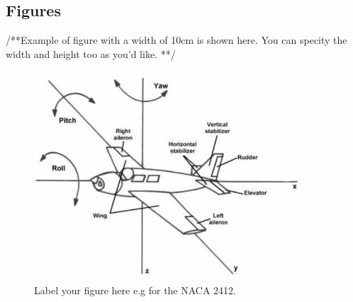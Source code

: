 \subsection{Figures}
/**Example of figure with a width of 10cm is shown here. You can specity the width and height too as you'd like. **/ \\
\begin{figure}[H]
        \centering
        \includegraphics[width=10cm]{Images/Control surfaces.jpg}
        \caption{Label your figure here e.g for the NACA 2412.}
        \label{fig:my_label}
    \end{figure}

